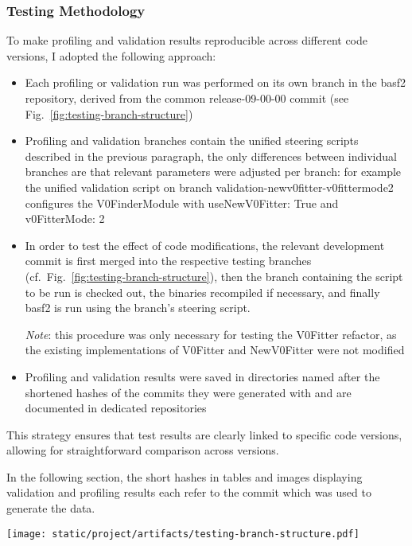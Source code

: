 \subsubsection{Testing Methodology}
To make profiling and validation results reproducible across different code versions, I adopted the following approach:

\begin{minipage}[t]{0.58\textwidth}%
  \vspace{0pt}
  \begin{itemize}
    \item Each profiling or validation run was performed on its own branch in the basf2 repository, derived from the common release-09-00-00 commit (see Fig.\ \ref{fig:testing-branch-structure})
    \item Profiling and validation branches contain the unified steering scripts described in the previous paragraph, the only differences between individual branches are that relevant parameters were adjusted per branch: for example the unified validation script on branch validation-newv0fitter-v0fittermode2 configures the V0FinderModule with useNewV0Fitter: True and v0FitterMode: 2
    \item In order to test the effect of code modifications, the relevant development commit is first merged into the respective testing branches (cf.\ Fig.\ \ref{fig:testing-branch-structure}), then the branch containing the script to be run is checked out, the binaries recompiled if necessary, and finally basf2 is run using the branch's steering script.\par
    \emph{Note}: this procedure was only necessary for testing the V0Fitter refactor, as the existing implementations of V0Fitter and NewV0Fitter were not modified
    \item Profiling and validation results were saved in directories named after the shortened hashes of the commits they were generated with and are documented in dedicated repositories\footnotemark
  \end{itemize}
  This strategy ensures that test results are clearly linked to specific code versions, allowing for straightforward comparison across versions.

  In the following section, the short hashes in tables and images displaying validation and profiling results each refer to the commit which was used to generate the data.
\end{minipage}%
\hspace{15pt}%
\begin{minipage}[t]{0.4\textwidth}%
  \vspace{-15pt}
  \hspace{-10pt}%
  \texttt{[image: static/project/artifacts/testing-branch-structure.pdf]}
  \vspace{-30pt}
  \label{fig:testing-branch-structure}
\end{minipage}%

